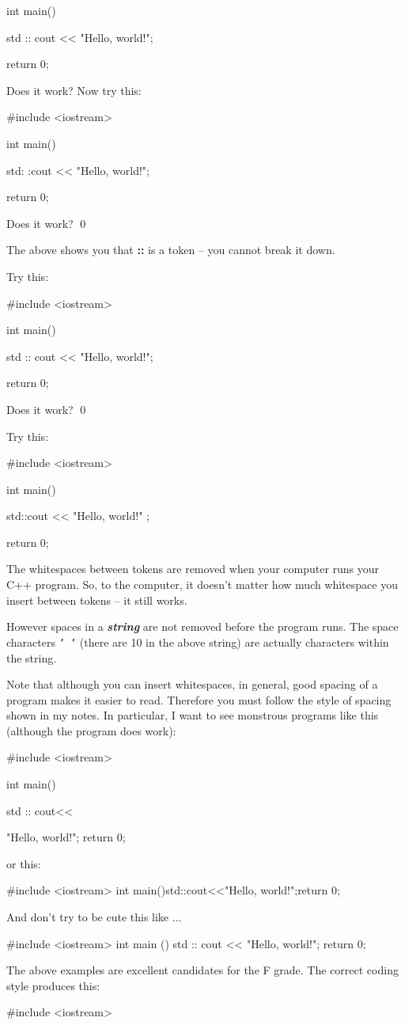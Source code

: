 \begin{console}[commandchars=\~\!\@]
\begin{ex}
\begin{console}
int main()
{
    std :: cout << "Hello, world!\n";

    return 0;
}
\end{console}
Does it work?
Now try this:
\begin{console}
#include <iostream>

int main()
{
    std:     :cout << "Hello, world!\n";

    return 0;
}
\end{console}
Does it work?
\qed
\end{ex}



The above 
shows you that \textbf{::} is a token -- you cannot break it down.


\begin{ex}
Try this:
\begin{console}
#include <iostream>

int main()
{
    std    ::    cout << "Hello, world!\n";

    return 0;
}
\end{console}
Does it work?
\qed
\end{ex}


Try this:
\begin{console}
#include <iostream>

int main()
{
    std::cout << "Hello,          world!\n" ;

    return 0;
}
\end{console}


The whitespaces between tokens are removed when your computer runs your C++ program. So, to the computer, it doesn't matter how much whitespace you insert between tokens -- it still works.

However spaces in a \textit{\textbf{string}} 
are not removed before the program runs. 
The space characters \texttt{' '}
(there are 10 in the above string) are actually characters within the string.

Note that although you can insert whitespaces, 
in general, good spacing of a program makes it easier to read. 
Therefore you must follow the style of spacing shown in my notes. 
In particular, I 
 want to see monstrous programs like this 
(although the program does work):
\begin{console}
#include <iostream>

int                        main(){std
::
                    cout<<

"Hello, world!\n"; return 0; }
\end{console}
or this: 
\begin{console}
#include <iostream>
int main(){std::cout<<"Hello, world!\n";return 0;}
\end{console}
And don't try to be cute this like ...
\begin{console}
#include <iostream>
int
 main
  ()
   {
    std
     ::
      cout
       <<
        "Hello, world!\n"; 
         return 0; 
          }
\end{console}
The above examples are excellent candidates for the F grade. 
The correct coding style produces this:
\begin{console}
#include <iostream>


\end{console}
\end{console}
